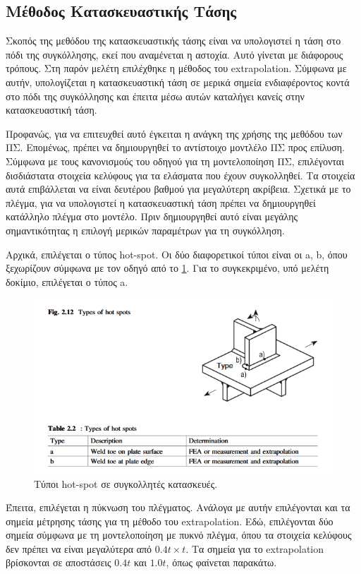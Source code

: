 \documentclass{article}
\begin{document}
\subsection{Μέθοδος Κατασκευαστικής Τάσης}
Σκοπός της μεθόδου της κατασκευαστικής τάσης είναι να υπολογιστεί η τάση στο πόδι της συγκόλλησης, εκεί που αναμένεται η αστοχία. Αυτό γίνεται με διάφορους τρόπους. Στη παρόν μελέτη επιλέχθηκε η μέθοδος του extrapolation. Σύμφωνα με αυτήν, υπολογίζεται η κατασκευαστική τάση σε μερικά σημεία ενδιαφέροντος κοντά στο πόδι της συγκόλλησης και έπειτα μέσω αυτών καταλήγει κανείς στην κατασκευαστική τάση.
\par Προφανώς, για να επιτευχθεί αυτό έγκειται η ανάγκη της χρήσης της μεθόδου των ΠΣ. Επομένως, πρέπει να δημιουργηθεί το αντίστοιχο μοντλέλο ΠΣ προς επίλυση. Σύμφωνα με τους κανονισμούς του οδηγού για τη μοντελοποίηση ΠΣ, επιλέγονται δισδιάστατα στοιχεία κελύφους για τα ελάσματα που έχουν συγκολληθεί. Τα στοιχεία αυτά επιβάλλεται να είναι δευτέρου βαθμού για μεγαλύτερη ακρίβεια. Σχετικά με το πλέγμα, για να υπολογιστεί η κατασκευαστική τάση πρέπει να δημιουργηθεί κατάλληλο πλέγμα στο μοντέλο. Πριν δημιουργηθεί αυτό είναι μεγάλης σημαντικότητας η επιλογή μερικών παραμέτρων για τη συγκόλληση.
\par Αρχικά, επιλέγεται ο τύπος hot-spot. Οι δύο διαφορετικοί τύποι είναι οι a, b, όπου ξεχωρίζουν σύμφωνα με τον οδηγό από το \ref{fig:hstype}. Για το συγκεκριμένο, υπό μελέτη δοκίμιο, επιλέγεται ο τύπος a.
\begin{figure}[H]
    \centering
    \includegraphics[width = 0.5\linewidth]{media/hstype.png}
    \caption{Τύποι hot-spot σε συγκολλητές κατασκευές.}
    \label{fig:hstype}
\end{figure}
\par Έπειτα, επιλέγεται η πύκνωση του πλέγματος. Ανάλογα με αυτήν επιλέγονται και τα σημεία μέτρησης τάσης για τη μέθοδο του extrapolation. Εδώ, επιλέγονται δύο σημεία σύμφωνα με τη μοντελοποίηση με πυκνό πλέγμα, όπου τα στοιχεία κελύφους δεν πρέπει να είναι μεγαλύτερα από $0.4 t \times t$. Τα σημεία για το extrapolation βρίσκονται σε αποστάσεις $0.4t$ και $1.0t$, όπως φαίνεται παρακάτω.
\end{document}
